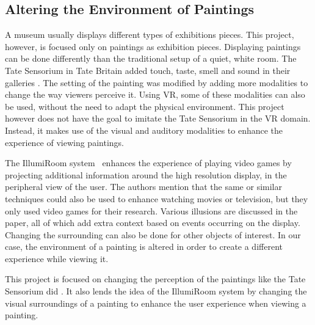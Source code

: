\documentclass[a4paper]{article}
\begin{document}
\subsection{Altering the Environment of Paintings}


A museum usually displays different types of exhibitions pieces. This project, however, is focused only on paintings as exhibition pieces. Displaying paintings can be done differently than the traditional setup of a quiet, white room. The Tate Sensorium \cite{tate1} in Tate Britain added touch, taste, smell and sound in their galleries \cite{tate2}. The setting of the painting was modified by adding more modalities to change the way viewers perceive it. Using VR, some of these modalities can also be used, without the need to adapt the physical environment. This project however does not have the goal to imitate the Tate Sensorium in the VR domain. Instead, it makes use of the visual and auditory modalities to enhance the experience of viewing paintings.

The IllumiRoom system~\cite{illumiroom} enhances the experience of playing video games by projecting additional information around the high resolution display, in the peripheral view of the user. The authors mention that the same or similar techniques could also be used to enhance watching movies or television, but they only used video games for their research. Various illusions are discussed in the paper, all of which add extra context based on events occurring on the display. Changing the surrounding can also be done for other objects of interest. In our case, the environment of a painting is altered in order to create a different experience while viewing it.


This project is focused on changing the perception of the paintings like the Tate Sensorium did \cite{tate2}. It also lends the idea of the IllumiRoom system \cite{illumiroom} by changing the visual surroundings of a painting to enhance the user experience when viewing a painting. %
\end{document}
